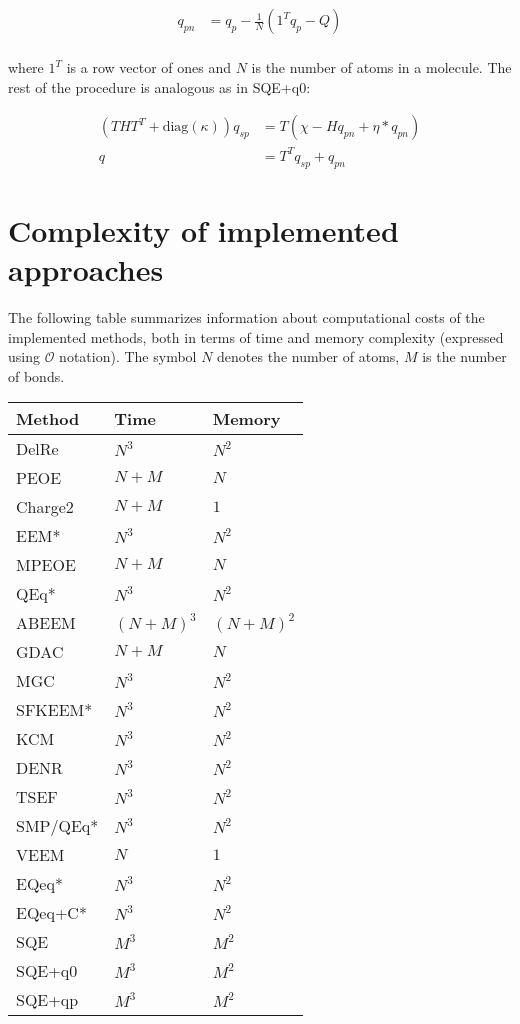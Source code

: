 \documentclass[oneside]{memoir}
\begin{document}
\begin{align}
    \label{eq:sqe_qp_norm}
    q_{pn} &= q_p - \frac{1}{N}\left(1^Tq_p - Q\right)\\
\end{align}

where $1^T$ is a row vector of ones and $N$ is the number of atoms in a molecule. The rest of the procedure is analogous as in SQE+q0:

\begin{align}
    \label{eq:sqe_qp}
    \left(THT^T + \mathrm{diag}(\kappa)\right)q_{sp} &= T(\chi - Hq_{pn} + \eta * q_{pn})\\
    q &= T^Tq_{sp} + q_{pn}
\end{align}


\chapter*{Complexity of implemented approaches}

The following table summarizes information about computational costs of the implemented methods, both in terms of time and memory complexity (expressed using ${\mathcal O}$ notation). The symbol $N$ denotes the number of atoms, $M$ is the number of bonds.
\bigskip

\begin{center}
\begin{tabular}{lll}
\toprule
Method & Time & Memory\\
\midrule
DelRe & $N^3$ & $N^2$\\
PEOE  & $N + M$ & $N$\\
Charge2 & $N + M$ & $1$\\
EEM* & $N^3$ & $N^2$\\
MPEOE & $N + M$& $N$\\
QEq* & $N^3$ & $N^2$ \\
ABEEM & $(N + M)^3$ & $(N + M)^2$\\
GDAC & $N + M$ & $N$\\
MGC & $N^3$& $N^2$\\
SFKEEM* & $N^3$& $N^2$\\
KCM & $N^3$ & $N^2$\\
DENR & $N^3$& $N^2$\\
TSEF & $N^3$ & $N^2$ \\
SMP/QEq* & $N^3$& $N^2$\\
VEEM & $N$& $1$ \\
EQeq* & $N^3$ & $N^2$ \\
EQeq+C* & $N^3$ & $N^2$\\
SQE & $M^3$ & $M^2$\\
SQE+q0 & $M^3$ & $M^2$\\
SQE+qp & $M^3$ & $M^2$\\
\bottomrule
\end{tabular}
\end{center}
\end{document}

